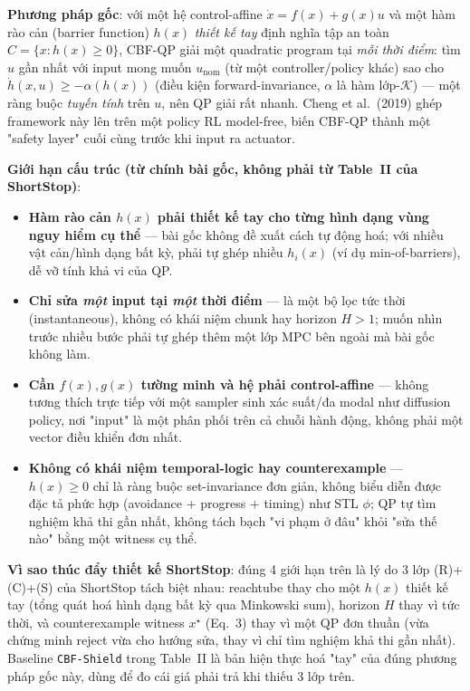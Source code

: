 \documentclass[a4paper,12pt]{article}
\begin{document}
\textbf{Phương pháp gốc}: với một hệ control-affine $\dot x = f(x)+g(x)u$ và một hàm rào cản (barrier function) $h(x)$ \emph{thiết kế tay} định nghĩa tập an toàn $C=\{x: h(x)\ge 0\}$, CBF-QP giải một quadratic program tại \emph{mỗi thời điểm}: tìm $u$ gần nhất với input mong muốn $u_{\text{nom}}$ (từ một controller/policy khác) sao cho $\dot h(x,u)\ge -\alpha(h(x))$ (điều kiện forward-invariance, $\alpha$ là hàm lớp-$\mathcal K$) --- một ràng buộc \emph{tuyến tính} trên $u$, nên QP giải rất nhanh. Cheng et al.\ (2019) ghép framework này lên trên một policy RL model-free, biến CBF-QP thành một "safety layer" cuối cùng trước khi input ra actuator.

\textbf{Giới hạn cấu trúc (từ chính bài gốc, không phải từ Table~II của ShortStop)}:
\begin{itemize}
  \item \textbf{Hàm rào cản $h(x)$ phải thiết kế tay cho từng hình dạng vùng nguy hiểm cụ thể} --- bài gốc không đề xuất cách tự động hoá; với nhiều vật cản/hình dạng bất kỳ, phải tự ghép nhiều $h_i(x)$ (ví dụ min-of-barriers), dễ vỡ tính khả vi của QP.
  \item \textbf{Chỉ sửa \emph{một} input tại \emph{một} thời điểm} --- là một bộ lọc tức thời (instantaneous), không có khái niệm chunk hay horizon $H>1$; muốn nhìn trước nhiều bước phải tự ghép thêm một lớp MPC bên ngoài mà bài gốc không làm.
  \item \textbf{Cần $f(x),g(x)$ tường minh và hệ phải control-affine} --- không tương thích trực tiếp với một sampler sinh xác suất/đa modal như diffusion policy, nơi "input" là một phân phối trên cả chuỗi hành động, không phải một vector điều khiển đơn nhất.
  \item \textbf{Không có khái niệm temporal-logic hay counterexample} --- $h(x)\ge 0$ chỉ là ràng buộc set-invariance đơn giản, không biểu diễn được đặc tả phức hợp (avoidance + progress + timing) như STL $\phi$; QP tự tìm nghiệm khả thi gần nhất, không tách bạch "vi phạm ở đâu" khỏi "sửa thế nào" bằng một witness cụ thể.
\end{itemize}

\textbf{Vì sao thúc đẩy thiết kế ShortStop}: đúng 4 giới hạn trên là lý do 3 lớp (R)+(C)+(S) của ShortStop tách biệt nhau: reachtube thay cho một $h(x)$ thiết kế tay (tổng quát hoá hình dạng bất kỳ qua Minkowski sum), horizon $H$ thay vì tức thời, và counterexample witness $x^\star$ (Eq.~3) thay vì một QP đơn thuần (vừa chứng minh reject vừa cho hướng sửa, thay vì chỉ tìm nghiệm khả thi gần nhất). Baseline \texttt{CBF-Shield} trong Table~II là bản hiện thực hoá "tay" của đúng phương pháp gốc này, dùng để đo cái giá phải trả khi thiếu 3 lớp trên.
\end{document}
